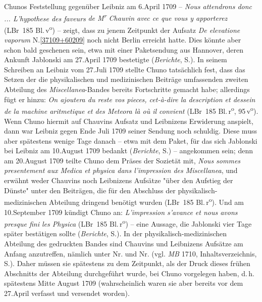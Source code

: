 \pend%
\pstart%
Chunos Feststellung gegenüber Leibniz am 6.\;April 1709 -- \textit{Nous attendrons donc ... L'hypothese des faveurs}\bracks{\textit{!}} \textit{de M\textsuperscript{r} Chauvin avec ce que vous y apporterez} (LBr~185 Bl.\,v\textsuperscript{o})\cite{02567} -- zeigt, dass zu jenem Zeitpunkt der Aufsatz \textit{De elevatione vaporum} N.\;\ref{37109+60209} noch nicht Berlin erreicht hatte.
Dies könnte aber schon bald geschenen sein, etwa mit einer Paketsendung aus Hannover, deren Ankunft Jablonski am 27.\;April 1709 bestetigte (\textit{Berichte}, S.).\cite{02568}
In seinem Schreiben an Leibniz vom 27.\;Juli 1709 stellte Chuno tatsächlich fest, dass das Setzen der die physikalischen und medizinischen Beiträge umfassenden zweiten Abteilung des \textit{Miscellanea}-Bandes bereits Fortschritte gemacht habe; allerdings fügt er hinzu: \textit{On ajoutera du reste vos pieces, cet-à-dire la description et dessein de la machine aritmetique et des Meteora là où il convient} (LBr~185 Bl.\,r\textsuperscript{o}, 95\,v\textsuperscript{o}).\cite{02569}
Wenn Chuno hiermit auf Chauvins Aufsatz und Leibnizens Erwiderung anspielt, dann war Leibniz gegen Ende Juli 1709 seiner Sendung noch schuldig.
Diese muss aber spätestens wenige Tage danach -- etwa mit dem Paket, für das sich Jablonski bei Leibniz am 10.\;August 1709 bedankt (\textit{Berichte}, S.)\cite{02570} -- angekommen sein; denn am 20.\;August 1709 teilte Chuno dem Präses der Sozietät mit, \textit{Nous sommes presentement aux Medica et physica dans l'impression des Miscellanea}, und erwähnt weder Chauvins noch Leibnizens Aufsätze "über den Aufstieg der Dünste" unter den Beiträgen, die für den Abschluss der physikalisch-medizinischen Abteilung dringend benötigt wurden (LBr~185 Bl.\,r\textsuperscript{o}).\cite{02571}
Und am 10.\;September 1709 kündigt Chuno an: \textit{L'impression s'avance et nous avons presque fini les Physica} (LBr~185 Bl.\,r\textsuperscript{o})\cite{02572} -- eine Aussage, die Jablonski vier Tage später bestätigen sollte (\textit{Berichte}, S.).\cite{02573}
In der physikalisch-medizinischen Abteilung des gedruckten Bandes sind Chauvins und Leibnizens Aufsätze am Anfang anzutreffen, nämlich unter Nr. und Nr. (vgl. \textit{MB} 1710, Inhaltsverzeichnis, S.).\cite{01411}
Daher müssen sie spätestens zu dem Zeitpunkt, als der Druck dieses frühen Abschnitts der Abteilung durchgeführt wurde, bei Chuno vorgelegen haben, d.\,h. spätestens Mitte August 1709 (wahrscheinlich waren sie aber bereits vor dem 27.\;April verfasst und versendet worden). %
